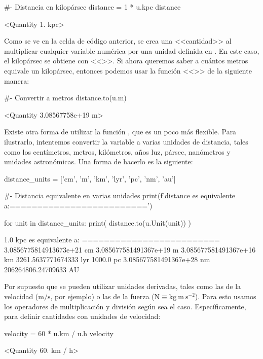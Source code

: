 \begin{pyin}[]
#- Distancia en kilopársec
distance = 1 * u.kpc
distance
\end{pyin}
\begin{pyout}
<Quantity 1. kpc>
\end{pyout}

Como se ve en la celda de código anterior, se crea una <<cantidad>> al multiplicar cualquier variable numérica por una unidad definida en . En este caso, el kilopársec se obtiene con <<>>. Si ahora queremos saber a cuántos metros equivale un kilopársec, entonces podemos usar la función <<>> de la siguiente manera:

\begin{pyin}[]
#- Convertir a metros
distance.to(u.m)
\end{pyin}
\begin{pyout}
<Quantity 3.08567758e+19 m>
\end{pyout}

Existe otra forma de utilizar la función , que es un poco más flexible. Para ilustrarlo, intentemos convertir la variable  a varias unidades de distancia, tales como los centímetros, metros, kilómetros, años luz, pársec, nanómetros y unidades astronómicas. Una forma de hacerlo es la siguiente:

\begin{pyin}
distance_units = ['cm', 'm', 'km', 'lyr', 'pc', 'nm', 'au']

#- Distancia equivalente en varias unidades
print(f'{distance} es equivalente a:\n=========================')

for unit in distance_units:
    print( distance.to(u.Unit(unit)) )  
\end{pyin}
\begin{pyprint}
1.0 kpc es equivalente a:
=========================
3.0856775814913673e+21 cm
3.085677581491367e+19 m
3.085677581491367e+16 km
3261.5637771674333 lyr
1000.0 pc
3.085677581491367e+28 nm
206264806.24709633 AU
\end{pyprint}

Por supuesto que se pueden utilizar unidades derivadas, tales como las de la velocidad ($ \mathrm{m/s} $, por ejemplo) o las de la fuerza ($ \mathrm{N \equiv kg~ m~ s^{-2}} $). Para esto usamos los operadores de multiplicación y división según sea el caso. Específicamente, para definir cantidades con unidades de velocidad:

\begin{pyin}
velocity = 60 * u.km / u.h
velocity
\end{pyin}
\begin{pyout}
<Quantity 60. km / h>
\end{pyout}

